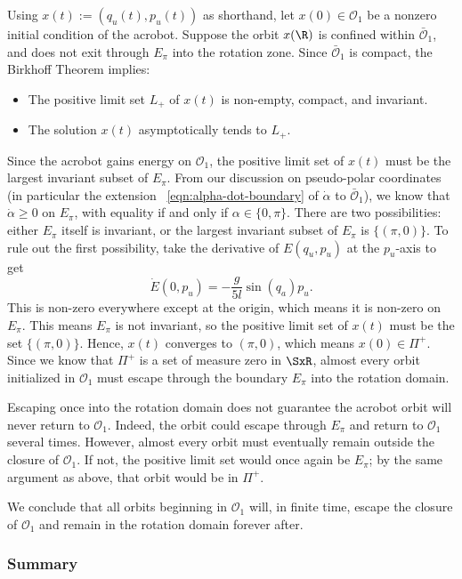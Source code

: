 Using \(x(t) := (q_u(t),p_u(t))\) as shorthand, let
\(x(0) \in \mathcal{O}_1\) be a nonzero initial condition of the acrobot.
Suppose the orbit \(x(\R)\) is confined within 
\(\bar{\mathcal{O}}_1\), and does not exit through \(E_\pi\) into the rotation
zone.
Since \(\bar{\mathcal{O}}_1\) is compact, the Birkhoff Theorem \cite{birkhoff}
implies:
\begin{itemize}
    \item The positive limit set \(L_+\) of \(x(t)\) is non-empty, compact, and
        invariant.
    \item The solution \(x(t)\) asymptotically tends to \(L_+\).
\end{itemize}
Since the acrobot gains energy on \(\mathcal{O}_1\), the positive limit set of
\(x(t)\) must be the largest invariant subset of \(E_\pi\). 
From our discussion on pseudo-polar coordinates (in particular the extension
~\eqref{eqn:alpha-dot-boundary} of \(\dot{\alpha}\) to \(\bar{\mathcal{O}}_1\)),
we know that \(\dot{\alpha} \geq 0\) on \(E_\pi\), with equality if and only if 
\(\alpha \in \{0,\pi\}\).
There are two possibilities: either \(E_\pi\) itself is invariant, or the
largest invariant subset of \(E_\pi\) is \(\{(\pi,0)\}\).
To rule out the first possibility, take the derivative of \(E(q_u,p_u)\) at the
\(p_u\)-axis to get
\[
    \dot{E}(0,p_u) = -\frac{g}{5l} \sin(q_a)p_u
    .
\]
This is non-zero everywhere except at the origin, which means it is non-zero on
\(E_\pi\). 
This means \(E_\pi\) is not invariant, so the positive limit set of \(x(t)\)
must be the set \(\{(\pi,0)\}\).
Hence, \(x(t)\) converges to \((\pi,0)\), which means \(x(0) \in \Pi^+\).
Since we know that \(\Pi^+\) is a set of measure zero in \(\SxR\), almost every
orbit initialized in \(\mathcal{O}_1\) must escape through the boundary
\(E_\pi\) into the rotation domain.

Escaping once into the rotation domain does not guarantee the acrobot
orbit will never return to \(\mathcal{O}_1\).
Indeed, the orbit could escape through \(E_\pi\) and return to \(\mathcal{O}_1\)
several times.
However, almost every orbit must eventually remain outside the closure of 
\(\mathcal{O}_1\). 
If not, the positive limit set would once again be
\(E_\pi\); by the same argument as above, that orbit would be in \(\Pi^+\).

We conclude that all orbits beginning in \(\mathcal{O}_1\) will, in finite time,
escape the closure of \(\mathcal{O}_1\) and remain in the rotation domain
forever after.

\subsubsection*{Summary}


